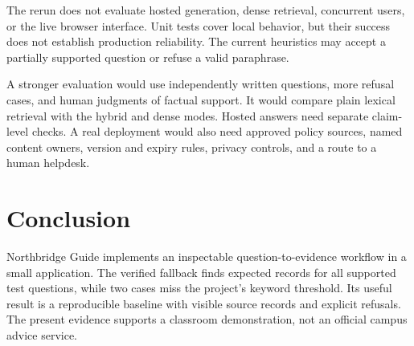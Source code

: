 \documentclass[11pt,a4paper]{article}
\begin{document}
The rerun does not evaluate hosted generation, dense retrieval, concurrent users, or the live browser interface. Unit tests cover local behavior, but their success does not establish production reliability. The current heuristics may accept a partially supported question or refuse a valid paraphrase.

A stronger evaluation would use independently written questions, more refusal cases, and human judgments of factual support. It would compare plain lexical retrieval with the hybrid and dense modes. Hosted answers need separate claim-level checks. A real deployment would also need approved policy sources, named content owners, version and expiry rules, privacy controls, and a route to a human helpdesk.

\section{Conclusion}
Northbridge Guide implements an inspectable question-to-evidence workflow in a small application. The verified fallback finds expected records for all supported test questions, while two cases miss the project's keyword threshold. Its useful result is a reproducible baseline with visible source records and explicit refusals. The present evidence supports a classroom demonstration, not an official campus advice service.
\end{document}
